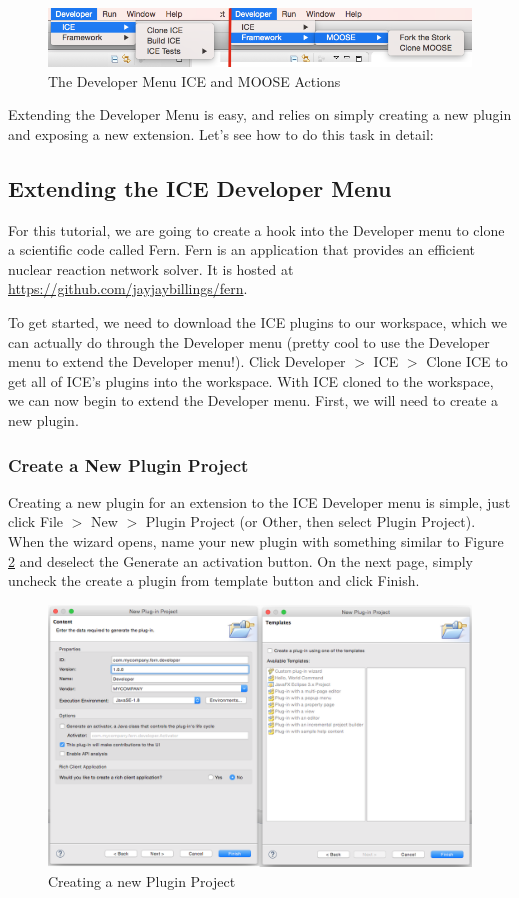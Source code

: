 \documentclass{article}
\begin{document}
\begin{figure}[h]
\includegraphics[width=\textwidth]{figures/menu.png}
\caption{The Developer Menu ICE and MOOSE Actions}
\label{fig:devcloneice}
\end{figure}

Extending the Developer Menu is easy, and relies on simply creating a new plugin
and exposing a new extension. Let's see how to do this task in detail:

\subsection*{Extending the ICE Developer Menu}
For this tutorial, we are going to create a hook into the Developer menu to
clone a scientific code called Fern. Fern is an application that provides an
efficient nuclear reaction network solver. It is hosted at
\url{https://github.com/jayjaybillings/fern}. 

To get started, we need to download the ICE plugins to our workspace, which we
can actually do through the Developer menu (pretty cool to use the Developer 
menu to extend the Developer menu!). Click Developer $>$ ICE $>$ Clone ICE to 
get all of ICE's plugins into the workspace. With ICE cloned to the workspace, 
we can now begin to extend the Developer menu. First, we will need to create a
new plugin. 

\subsubsection*{Create a New Plugin Project}
Creating a new plugin for an extension to the ICE Developer menu is simple, just
click File $>$ New $>$ Plugin Project (or Other, then select Plugin Project).
When the wizard opens, name your new plugin with something similar to Figure
\ref{fig:newplugin} and deselect the Generate an activation button. On the next
page, simply uncheck the create a plugin from template button and click Finish. 
\begin{figure}[h]
\includegraphics[width=\textwidth]{figures/combinedplugin.png}
\caption{Creating a new Plugin Project}
\label{fig:newplugin}
\end{figure}
\end{document}
